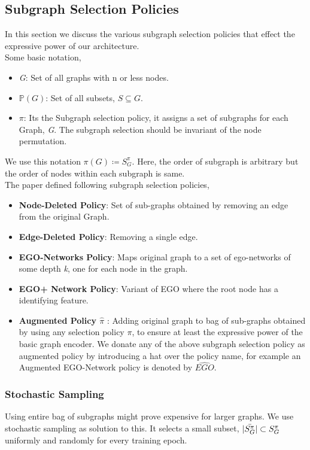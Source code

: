 \documentclass[11pt, dvipsnames, DIV=12]{scrreprt}
\theoremstyle{definition}
\begin{document}
\subsection{Subgraph Selection Policies}
In this section we discuss the various subgraph selection policies that effect the expressive power of our architecture.\\
Some basic notation,
\begin{itemize}
    \item \textit{G}: Set of all graphs with n or less nodes.
    \item $\mathbb{P}(G)$: Set of all subsets, $S \subseteq G$.
    \item $\pi$: Its the Subgraph selection policy, it assigns a set of subgraphs for each Graph, \textit{G}. The subgraph selection should be invariant of the node permutation.
\end{itemize}
We use this notation $\pi(G)\coloneqq S^\pi_G$. Here, the order of subgraph is arbitrary but the order of nodes within each subgraph is same.\\
The paper defined following subgraph selection policies,
\begin{itemize}
    \item \textbf{Node-Deleted Policy}: Set of sub-graphs obtained by removing an edge from the original Graph.
    \item \textbf{Edge-Deleted Policy}: Removing a single edge.
    \item \textbf{EGO-Networks Policy}: Maps original graph to a set of ego-networks of some depth \emph{k}, one for each node in the graph.
    \item \textbf{EGO+ Network Policy}: Variant of EGO where the root node has a identifying feature.
    \item \textbf{Augmented Policy $\hat{\pi}$} : Adding original graph to bag of sub-graphs obtained by using any selection policy $\pi$, to ensure at least the expressive power of the basic graph encoder. We donate any of the above subgraph selection policy as augmented policy by introducing a hat over the policy name, for example an Augmented EGO-Network policy is denoted by $\widehat{EGO}$.
\end{itemize}
\subsubsection{Stochastic Sampling} Using entire bag of subgraphs might prove expensive for larger graphs. We use stochastic sampling as solution to this. It selects a small subset, $|\Bar{S^\pi_G}|\subset S^\pi_G$ uniformly and randomly for every training epoch.
\end{document}
